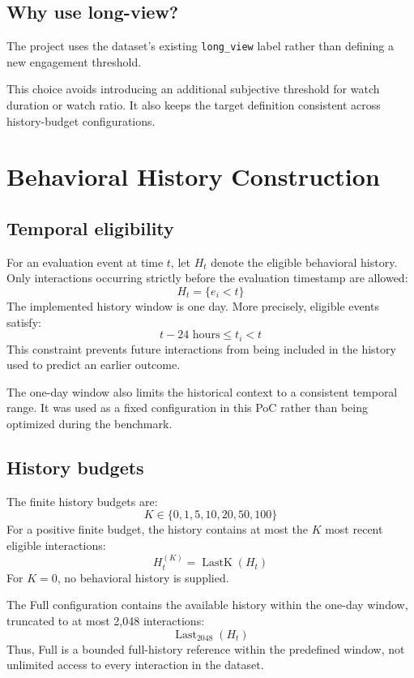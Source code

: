 \documentclass[11pt,a4paper]{article}
\begin{document}
\subsection{Why use long-view?}
The project uses the dataset's existing \texttt{long\_view} label rather than defining a new engagement threshold.

This choice avoids introducing an additional subjective threshold for watch duration or watch ratio. It also keeps the target definition consistent across history-budget configurations.

\section{Behavioral History Construction}
\subsection{Temporal eligibility}
For an evaluation event at time $t$, let $H_t$ denote the eligible behavioral history. Only interactions occurring strictly before the evaluation timestamp are allowed:
\begin{equation}
H_t = \{e_i < t\}
\end{equation}
The implemented history window is one day. More precisely, eligible events satisfy:
\begin{equation}
t - 24\text{ hours} \leq t_i < t
\end{equation}
This constraint prevents future interactions from being included in the history used to predict an earlier outcome.

The one-day window also limits the historical context to a consistent temporal range. It was used as a fixed configuration in this PoC rather than being optimized during the benchmark.

\subsection{History budgets}
The finite history budgets are:
\begin{equation}
K \in \{0, 1, 5, 10, 20, 50, 100\}
\end{equation}
For a positive finite budget, the history contains at most the $K$ most recent eligible interactions:
\begin{equation}
H_t^{(K)} = \operatorname{LastK}(H_t)
\end{equation}
For $K = 0$, no behavioral history is supplied.

The Full configuration contains the available history within the one-day window, truncated to at most 2,048 interactions:
\begin{equation}
\operatorname{Last}_{2048}(H_t)
\end{equation}
Thus, Full is a bounded full-history reference within the predefined window, not unlimited access to every interaction in the dataset.
\end{document}
